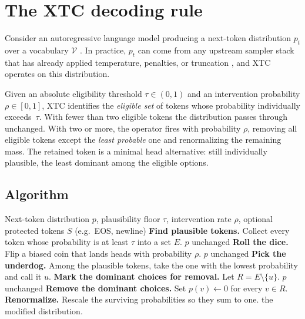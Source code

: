 \documentclass{article}
\newcommand{\xtc}{\textsc{XTC}}
\newcommand{\Vocab}{\mathcal{V}}
\newcommand{\pt}{p_t}
\begin{document}
\section{The \xtc{} decoding rule}
\label{sec:method}

Consider an autoregressive language model producing a next-token distribution $\pt$ over a vocabulary $\Vocab$ \citep{bengio2003neural, radford2019language}.
In practice, $\pt$ can come from any upstream sampler stack that has already applied temperature, penalties, or truncation \citep{wiher2022decoding}, and \xtc{} operates on this distribution.

Given an absolute eligibility threshold $\tau \in (0,1)$ and an intervention probability $\rho \in [0,1]$, \xtc{} identifies the \emph{eligible set} of tokens whose probability individually exceeds~$\tau$.
With fewer than two eligible tokens the distribution passes through unchanged.
With two or more, the operator fires with probability $\rho$, removing all eligible tokens except the \emph{least probable} one and renormalizing the remaining mass.
The retained token is a minimal head alternative: still individually plausible, the least dominant among the eligible options.

\subsection{Algorithm}

\begin{algorithm}[t]
\caption{\xtc{} sampling step. Plain-language reading: ``If the model is genuinely undecided between strong choices, with probability $\rho$ throw away the dominant ones and keep only the underdog.''}
\label{alg:xtc}
\begin{algorithmic}[1]
\Require Next-token distribution $p$, plausibility floor $\tau$, intervention rate $\rho$, optional protected tokens $S$ (e.g.\ EOS, newline)
\State \textbf{Find plausible tokens.} Collect every token whose probability is at least $\tau$ into a set $E$.
    \State \Return $p$ unchanged 
\EndIf
\State \textbf{Roll the dice.} Flip a biased coin that lands heads with probability $\rho$.
    \State \Return $p$ unchanged 
\EndIf
\State \textbf{Pick the underdog.} Among the plausible tokens, take the one with the lowest probability and call it $u$.
\State \textbf{Mark the dominant choices for removal.} Let $R = E \setminus \{u\}$.
    \State \Return $p$ unchanged 
\EndIf
\State \textbf{Remove the dominant choices.} Set $p(v) \gets 0$ for every $v \in R$.
\State \textbf{Renormalize.} Rescale the surviving probabilities so they sum to one.
\State \Return the modified distribution.
\end{algorithmic}
\end{algorithm}
\end{document}
